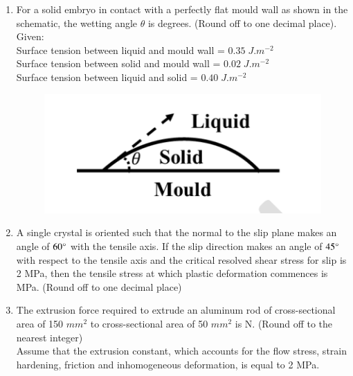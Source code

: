 \documentclass[journal]{IEEEtran}
\theoremstyle{remark}
\begin{document}
\begin{enumerate}[resume]
\item For a solid embryo in contact with a perfectly flat mould wall as shown in the schematic, the wetting angle $\theta$ is \underline{\hspace{2cm}} degrees. (Round off to one decimal place). \hfill{}\\
Given: \\
Surface tension between liquid and mould wall = $0.35\; J.m^{-2}$ \\
Surface tension between solid and mould wall = $0.02\; J.m^{-2}$ \\
Surface tension between liquid and solid = $0.40\; J.m^{-2}$
\begin{figure}[H]
    \centering
    \includegraphics[width=0.3\columnwidth]{figs/Q.33.png}
    \caption{}
    \label{fig:placeholder}
\end{figure}

\item A single crystal is oriented such that the normal to the slip plane makes an angle of $60\degree$ with the tensile axis. If the slip direction makes an angle of $45\degree$ with respect to the tensile axis and the critical resolved shear stress for slip is 2 MPa, then the tensile stress at which plastic deformation commences is \underline{\hspace{2cm}} MPa. (Round off to one decimal place) \hfill{}

\item The extrusion force required to extrude an aluminum rod of cross-sectional area of 150 $mm^2$ to cross-sectional area of 50 $mm^2$ is \underline{\hspace{2cm}} N. (Round off to the nearest integer) \hfill{}\\
Assume that the extrusion constant, which accounts for the flow stress, strain hardening, friction and inhomogeneous deformation, is equal to 2 MPa.

\end{enumerate}
\end{document}

